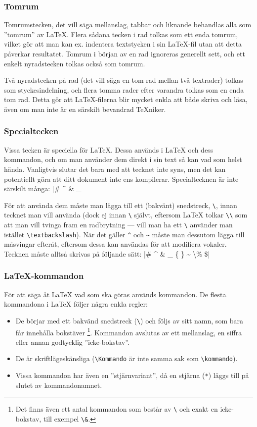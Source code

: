 \documentclass[draft,swe,10pt,nofont]{skrapport}
\makeatletter
\let\@oldLaTeX\LaTeX
\def\LaTeX{\texorpdfstring{\@oldLaTeX}{LaTeX}}
\newcommand\cmd[1]{\texttt{\textbackslash{}#1}}			%
\makeatother
\begin{document}
	\subsubsection{Tomrum}
	Tomrumstecken, det vill säga mellanslag, tabbar och liknande behandlas
	alla som ”tomrum” av \LaTeX{}. Flera sådana tecken i rad tolkas som ett
	enda tomrum, vilket gör att man kan ex. indentera textstycken i sin
	\LaTeX-fil utan att detta påverkar resultatet. Tomrum i början av en rad
	ignoreras generellt sett, och ett enkelt nyradstecken tolkas också som
	tomrum.
	
	Två nyradstecken på rad (det vill säga en tom rad mellan två textrader) tolkas som
	styckesindelning, och flera tomma rader efter varandra tolkas som en enda
	tom rad. Detta gör att \LaTeX{}-filerna blir mycket enkla att både skriva
	och läsa, även om man inte är en särskilt bevandrad \TeX{}niker.
	
	\subsubsection{Specialtecken}
	Vissa tecken är speciella för \LaTeX{}. Dessa används i \LaTeX{} och dess
	kommandon, och om man använder dem direkt i sin text så kan vad som helst
	hända. Vanligtvis slutar det bara med att tecknet inte syns, men det kan
	potentiellt göra att ditt dokument inte ens kompilerar. Specialtecknen
	är inte särskilt många:
	\latex|# ^ & _ { } ~ \ %
	
	För att använda dem måste man lägga till ett (bakvänt) snedstreck,
	\cmd{}, innan tecknet man vill använda (dock ej innan
	\cmd{} självt, eftersom \LaTeX{} tolkar
	\cmd{\textbackslash} som att man vill tvinga fram en
	radbrytning — vill man ha ett \cmd{} använder man istället
	\cmd{textbackslash}).
	När det gäller \verb|^| och \verb|~| måste man
	dessutom lägga till måsvingar efteråt, eftersom dessa kan användas för att
	modifiera vokaler. Tecknen måste alltså skrivas på följande sätt:
	\latex|\# \^{} \& \_ \{ \} \~{} \textbackslash \% \$|
	
	\subsubsection{\LaTeX-kommandon}
	För att säga åt \LaTeX{} vad som ska göras används kommandon. De flesta
	kommandona i \LaTeX{} följer några enkla regler:
	\begin{itemize}
		\item De börjar med ett bakvänd snedstreck (\cmd{}) och följs av sitt
		namn, som bara får innehålla bokstäver%
		\footnote{Det finns även ett antal kommandon som består av \cmd{} och
		exakt en icke-bokstav, till exempel \cmd{\&}.}.
		Kommandon avslutas av ett
		mellanslag, en siffra eller annan godtycklig ”icke-bokstav”.
		
		\item De är skriftlägeskänsliga (\cmd{Kommando} är inte samma sak som
		\cmd{kommando}).
		
		\item Vissa kommandon har även en ”stjärnvariant”, då en stjärna
		(\texttt{*}) läggs till på slutet av kommandonamnet.
	\end{itemize}
	
\end{document}
